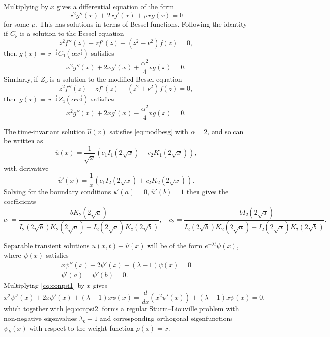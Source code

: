 \documentclass[parskip=half]{scrartcl}
\theoremstyle{nonumberplain}
\begin{document}
Multiplying by $x$ gives a differential equation of the form
\begin{equation}
    \label{eq:conicmu}
    x^2 g''(x) + 2x g'(x) + \mu x g(x) = 0
\end{equation}
for some $\mu$. This has solutions in terms of Bessel functions.
Following the identity if $C_\nu$
is a solution to the Bessel equation
\begin{equation}
    z^2 f''(z) + z f'(z) - (z^2 - \nu^2) f(z) = 0,
\end{equation}
then $g(x) = x^{-\frac{1}{2}}C_1(\alpha x^\frac{1}{2})$ satisfies
\begin{equation}
    \label{eq:besg}
    x^2 g''(x) + 2x g'(x) + \frac{\alpha^2}{4} x g(x) = 0.
\end{equation}
Similarly, if $Z_\nu$ is a solution to the modified Bessel equation
\begin{equation}
    z^2 f''(z) + z f'(z) - (z^2 + \nu^2) f(z) = 0,
\end{equation}
then $g(x) = x^{-\frac{1}{2}}Z_1(\alpha x^\frac{1}{2})$ satisfies
\begin{equation}
    \label{eq:modbesg}
    x^2 g''(x) + 2x g'(x) - \frac{\alpha^2}{4} x g(x) = 0.
\end{equation}

The time-invariant solution $\hat u(x)$ satisfies \eqref{eq:modbesg} with $\alpha=2$, and so
can be written as
\begin{equation}
    \hat u(x) = \frac{1}{\sqrt{x}} \left(c_1 I_1(2\sqrt{x}) - c_2 K_1(2\sqrt{x})\right),
\end{equation}
with derivative
\begin{equation}
    \hat u'(x) = \frac{1}{x} \left(c_1 I_2(2\sqrt{x}) + c_2 K_2(2\sqrt{x})\right).
\end{equation}
Solving for the boundary conditions $\hat u'(a)=0$, $\hat u'(b)=1$ then gives the coefficients
\begin{equation}
    c_1 = \frac{b K_2(2\sqrt{a})}{I_2(2\sqrt{b})K_2(2\sqrt{a})-I_2(2\sqrt{a})K_2(2\sqrt{b})},\quad
    c_2 = \frac{-b I_2(2\sqrt{a})}{I_2(2\sqrt{b})K_2(2\sqrt{a})-I_2(2\sqrt{a})K_2(2\sqrt{b})}.
\end{equation}

Separable transient solutions $u(x,t)-\hat u(x)$ will be of the form $e^{-\lambda t}\psi(x)$,
where $\psi(x)$ satisfies
\begin{gather}
    \label{eq:conpsi1}
    x\psi''(x) + 2\psi'(x) + (\lambda-1)\psi(x) = 0\\
    \label{eq:conpsi2}
    \psi'(a) = \psi'(b) = 0.
\end{gather}
Multiplying \eqref{eq:conpsi1} by $x$ gives
\begin{equation}
    \label{eq:conpsils}
    x^2\psi''(x) + 2x\psi'(x) + (\lambda-1)x \psi(x) =
    \frac{d}{dx}(x^2\psi'(x)) + (\lambda-1)x \psi(x) = 0,
\end{equation}
which together with \eqref{eq:conpsi2} forms a regular Sturm--Liouville problem with
non-negative eigenvalues $\lambda_k-1$ and corresponding orthogonal eigenfunctions
$\psi_k(x)$ with respect to the weight function $\rho(x) = x$.
\end{document}
